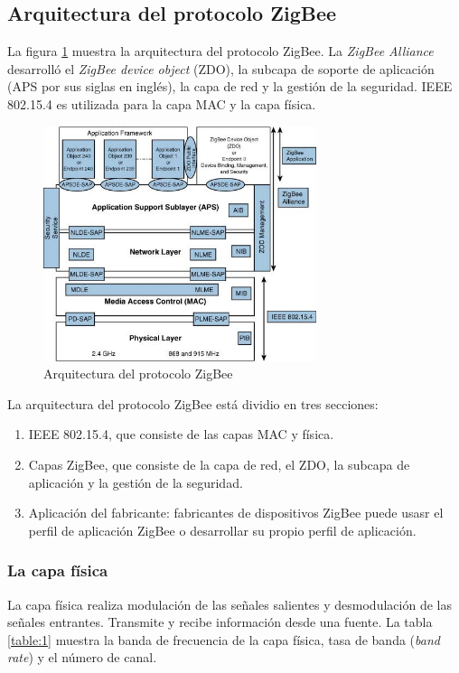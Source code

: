 \documentclass[10pt,journal,compsoc]{IEEEtran}
\begin{document}
\subsection{Arquitectura del protocolo ZigBee}
La figura \ref{fig:zigbee-architecture} muestra la arquitectura del protocolo ZigBee. La \emph{ZigBee Alliance} desarrolló el \emph{ZigBee device object} (ZDO), la subcapa de soporte de aplicación (APS por sus siglas en inglés), la capa de red y la gestión de la seguridad. IEEE 802.15.4 es utilizada para la capa MAC y la capa física. 

\begin{figure}[h]
    \centering
    \includegraphics[width=8cm]{zigbee-architecture}
    \caption{Arquitectura del protocolo ZigBee}
    \label{fig:zigbee-architecture}
\end{figure}

La arquitectura del protocolo ZigBee está dividio en tres secciones:
\begin{enumerate}
    \item IEEE 802.15.4, que consiste de las capas MAC y física.
    \item Capas ZigBee, que consiste de la capa de red, el ZDO, la subcapa de aplicación y la gestión de la seguridad.
    \item Aplicación del fabricante: fabricantes de dispositivos ZigBee puede usasr el perfil de aplicación ZigBee o desarrollar su propio perfil de aplicación.
\end{enumerate}

\subsubsection{La capa física}
La capa física realiza modulación de las señales salientes y desmodulación de las señales entrantes. Transmite y recibe información desde una fuente. La tabla \ref{table:1} muestra la banda de frecuencia de la capa física, tasa de banda (\emph{band rate}) y el número de canal.
\end{document}
